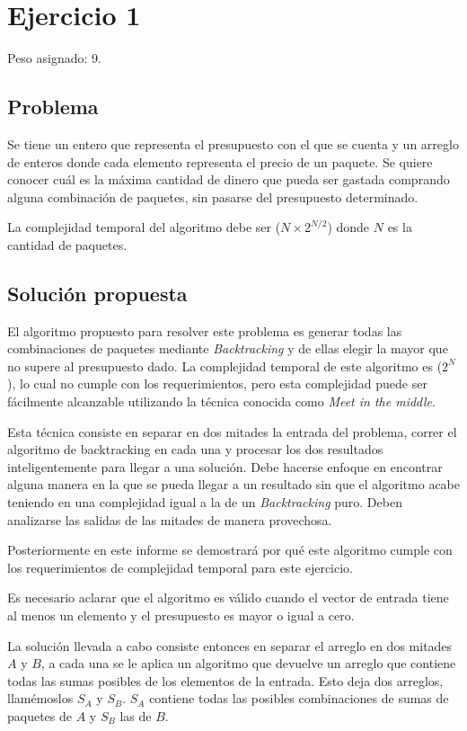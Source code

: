 \section{Ejercicio 1}

Peso asignado: 9.

\subsection{Problema}

Se tiene un entero que representa el presupuesto con el que se cuenta y un
arreglo de enteros donde cada elemento representa el precio de un paquete. Se
quiere conocer cuál es la máxima cantidad de dinero que pueda ser gastada
comprando alguna combinación de paquetes, sin pasarse del presupuesto
determinado.

La complejidad temporal del algoritmo debe ser \ord($N \times 2^{N / 2}$) donde
$N$ es la cantidad de paquetes.

\subsection{Solución propuesta}

El algoritmo propuesto para resolver este problema es generar todas las
combinaciones de paquetes mediante \textit{Backtracking} y de ellas elegir la
mayor que no supere al presupuesto dado. La complejidad temporal de este
algoritmo es \ord($2^N$), lo cual no cumple con los requerimientos, pero esta
complejidad puede ser fácilmente alcanzable utilizando la técnica conocida como
\textit{Meet in the middle}.

Esta técnica consiste en separar en dos mitades la entrada del problema, correr
el algoritmo de backtracking en cada una y procesar los dos resultados
inteligentemente para llegar a una solución. Debe hacerse enfoque en encontrar
alguna manera en la que se pueda llegar a un resultado sin que el algoritmo
acabe teniendo en una complejidad igual a la de un \textit{Backtracking} puro.
Deben analizarse las salidas de las mitades de manera provechosa.

Posteriormente en este informe se demostrará por qué este algoritmo cumple con
los requerimientos de complejidad temporal para este ejercicio.

Es necesario aclarar que el algoritmo es válido cuando el vector de entrada
tiene al menos un elemento y el presupuesto es mayor o igual a cero.

La solución llevada a cabo consiste entonces en separar el arreglo en dos
mitades $A$ y $B$, a cada una se le aplica un algoritmo que devuelve un arreglo
que contiene todas las sumas posibles de los elementos de la entrada. Esto deja
dos arreglos, llamémoslos $S_A$ y $S_B$. $S_A$ contiene todas las posibles
combinaciones de sumas de paquetes de $A$ y $S_B$ las de $B$.


